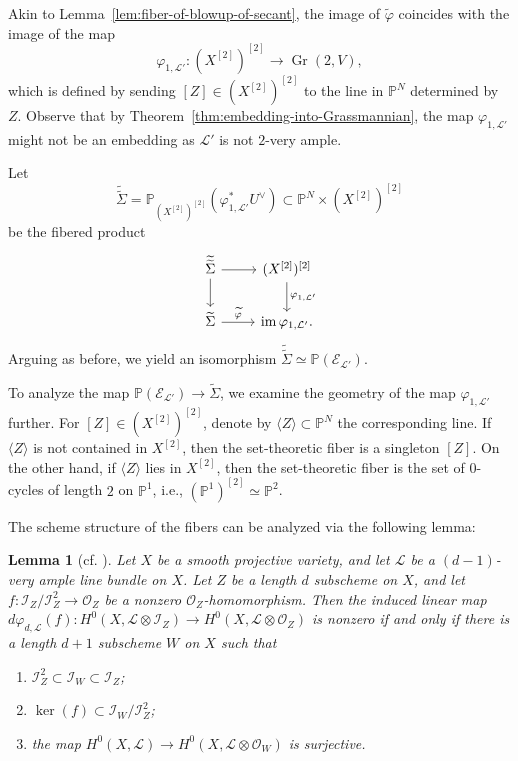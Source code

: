 \documentclass[a4paper]{amsart}
\numberwithin{equation}{section}
\theoremstyle{plain}
\newtheorem{lem}[thm]{Lemma}
\theoremstyle{definition}
\theoremstyle{remark}
\numberwithin{figure}{section}
\numberwithin{table}{section}
\numberwithin{equation}{section}
\def \PP {\mathbb{P}}
\def \Ecal {\mathcal{E}}
\def \Ical {\mathcal{I}}
\def \Lcal {\mathcal{L}}
\def \Ocal {\mathcal{O}}
\DeclareMathOperator{\im}{im}
\DeclareMathOperator{\Gr}{Gr}
\begin{document}
Akin to Lemma~\ref{lem:fiber-of-blowup-of-secant}, the image of $\widetilde{\varphi}$ coincides with the image of the map
 \[
  \varphi_{1, \Lcal'}: (X^{[2]})^{[2]} \rightarrow \Gr(2,V),
 \]
which is defined by sending $[Z] \in (X^{[2]})^{[2]}$ to the line in $\PP^N$ determined by $Z$.
Observe that by Theorem~\ref{thm:embedding-into-Grassmannian}, the map $\varphi_{1, \Lcal'}$ might not be an embedding as $\Lcal'$ is not $2$-very ample.

Let
 \[
  \widetilde{\widetilde{\Sigma}} = \PP_{(X^{[2]})^{[2]}}(\varphi_{1, \Lcal'}^{\ast}U^{\vee})
    \subset \PP^N \times (X^{[2]})^{[2]}
 \]
be the fibered product
 \[
  \begin{tikzcd}
      \widetilde{\widetilde{\Sigma}} \arrow{r} \arrow{d} & (X^{[2]})^{[2]} \arrow[d, "\varphi_{1, \Lcal'}"] \\
      \widetilde{\Sigma} \arrow[r, "\widetilde{\varphi}"] & \im \varphi_{1, \Lcal'}.
  \end{tikzcd}
 \]
Arguing as before, we yield an isomorphism $\widetilde{\widetilde{\Sigma}} \simeq \PP(\Ecal_{\Lcal'})$.

To analyze the map $\PP(\Ecal_{\Lcal'}) \rightarrow \widetilde{\Sigma}$, we examine the geometry of the map $\varphi_{1, \Lcal'}$ further.
For $[Z] \in (X^{[2]})^{[2]}$, denote by $\langle Z \rangle \subset \PP^N$ the corresponding line.
If $\langle Z \rangle$ is not contained in $X^{[2]}$, then the set-theoretic fiber is a singleton $[Z]$.
On the other hand, if $\langle Z \rangle$ lies in $X^{[2]}$, then the set-theoretic fiber is the set of $0$-cycles of length $2$ on $\PP^1$, i.e., $(\PP^1)^{[2]} \simeq \PP^2$.

The scheme structure of the fibers can be analyzed via the following lemma:

\begin{lem}[cf. {\cite[Corollary~1.2]{CG1990}}] \label{lem:Hilbert-scheme-to-Grassmannian}
    Let $X$ be a smooth projective variety, and let $\Lcal$ be a $(d-1)$-very ample line bundle on $X$.
    Let $Z$ be a length $d$ subscheme on $X$, and let $f:\Ical_Z/\Ical_Z^2 \rightarrow \Ocal_Z$ be a nonzero $\Ocal_Z$-homomorphism.
    Then the induced linear map $d\varphi_{d, \Lcal}(f):H^0(X, \Lcal \otimes \Ical_Z) \rightarrow H^0(X, \Lcal \otimes \Ocal_Z)$ is nonzero if and only if there is a length $d+1$ subscheme $W$ on $X$ such that
    \begin{enumerate}
        \item $\Ical_{Z}^2 \subset \Ical_W \subset \Ical_Z$;
        \item $\ker(f) \subset \Ical_W/\Ical_Z^2$;
        \item the map $H^0(X, \Lcal) \rightarrow H^0(X, \Lcal \otimes \Ocal_{W})$ is surjective.
    \end{enumerate}
\end{lem}
\end{document}
